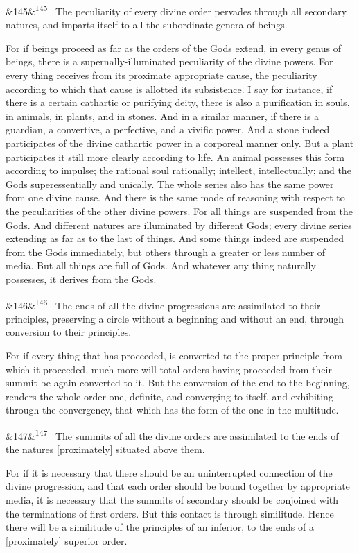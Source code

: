 \documentclass[12pt]{article}
\newcommand{\para}[1][]{\par\noindent\ifx&#1&\else\textsuperscript{\footnotesize #1}~\fi}
\begin{document}
\para[145] The peculiarity of every divine order pervades through all secondary natures, and imparts itself to all the subordinate genera of beings.

For if beings proceed as far as the orders of the Gods extend, in every genus of beings, there is a supernally-illuminated peculiarity of the divine powers. For every thing receives from its proximate appropriate cause, the peculiarity according to which that cause is allotted its subsistence. I say for instance, if there is a certain cathartic or purifying deity, there is also a purification in souls, in animals, in plants, and in stones. And in a similar manner, if there is a guardian, a convertive, a perfective, and a vivific power. And a stone indeed participates of the divine cathartic power in a corporeal manner only. But a plant participates it still more clearly according to life. An animal possesses this form according to impulse; the rational soul rationally; intellect, intellectually; and the Gods superessentially and unically. The whole series also has the same power from one divine cause. And there is the same mode of reasoning with respect to the peculiarities of the other divine powers. For all things are suspended from the Gods. And different natures are illuminated by different Gods; every divine series extending as far as to the last of things. And some things indeed are suspended from the Gods immediately, but others through a greater or less number of media. But all things are full of Gods. And whatever any thing naturally possesses, it derives from the Gods.

\para[146] The ends of all the divine progressions are assimilated to their principles, preserving a circle without a beginning and without an end, through conversion to their principles.

For if every thing that has proceeded, is converted to the proper principle from which it proceeded, much more will total orders having proceeded from their summit be again converted to it. But the conversion of the end to the beginning, renders the whole order one, definite, and converging to itself, and exhibiting through the convergency, that which has the form of the one in the multitude.

\para[147] The summits of all the divine orders are assimilated to the ends of the natures [proximately] situated above them.

For if it is necessary that there should be an uninterrupted connection of the divine progression, and that each order should be bound together by appropriate media, it is necessary that the summits of secondary should be conjoined with the terminations of first orders. But this contact is through similitude. Hence there will be a similitude of the principles of an inferior, to the ends of a [proximately] superior order.
\end{document}
